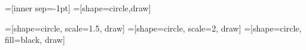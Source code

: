 
=[inner sep=-1pt]
=[shape=circle,draw]

=[shape=circle, scale=1.5, draw]
=[shape=circle, scale=2, draw]
=[shape=circle, fill=black, draw]


\newcommand*{\StrikeThruDistance}{0.15cm}%
\newcommand*{\StrikeThru}{\StrikeThruDistance,\StrikeThruDistance}%






\newcommand{\linmonw} {\xymatrixcolsep{4mm} \xymatrix{ \ar@{-||}[r]^{\circ} & }}
\newcommand{\linmonwl} {\xymatrixcolsep{4mm} \xymatrix{ \ar@{-||}[r]^{\otimes\;\tri} & }}
\newcommand{\linmonwr} {\xymatrixcolsep{4mm} \xymatrix{ \ar@{-||}[r]^{\tri\;\otimes} & }}
\newcommand{\linmonwrdavid} {\xymatrixcolsep{4mm} \xymatrix{ \ar@{-||}[r]^{\otimes\;\tri} & }}
\newcommand{\linmonwldavid} {\xymatrixcolsep{4mm} \xymatrix{ \ar@{-||}[r]^{\tri\;\otimes} & }}
\newcommand{\linmondavid} {\xymatrixcolsep{4mm} \xymatrix{ \ar@{-||}[r] & }}

\newcommand{\lincomonb} {\xymatrixcolsep{4mm} \xymatrix{ \ar@{-||}[r]_{\bullet} & }}
\newcommand{\lincomonw} {\xymatrixcolsep{4mm} \xymatrix{ \ar@{-||}[r]_{\circ} & }}
\newcommand{\lincomonwr} {\xymatrixcolsep{4mm} \xymatrix{ \ar@{-||}[r]_{\tri\;\otimes} & }}
\newcommand{\lincomonwl} {\xymatrixcolsep{4mm} \xymatrix{ \ar@{-||}[r]_{\otimes\;\tri} & }}
\newcommand{\lincomonbr} {\xymatrixcolsep{4mm} \xymatrix{ \ar@{-||}[r]_{\btri\;\otimes} & }}
\newcommand{\lincomonbl} {\xymatrixcolsep{4mm} \xymatrix{ \ar@{-||}[r]_{\otimes\;\btri} & }}

\newcommand{\linbialgw} {\xymatrixcolsep{4mm} \xymatrix{ \ar@{-||}[r]^{\circ}_{\circ} & }}
\newcommand{\linbialgwl} {\xymatrixcolsep{4mm} \xymatrix{ \ar@{-||}[r]^{\otimes\;\tri}_{\otimes\;\tri} & }}
\newcommand{\linbialgwr} {\xymatrixcolsep{4mm} \xymatrix{ \ar@{-||}[r]^{\tri\;\otimes}_{\tri\;\otimes} & }}
\newcommand{\linbialgwb} {\xymatrixcolsep{4mm} \xymatrix{ \ar@{-||}[r]^{\circ}_{\bullet} & }}


